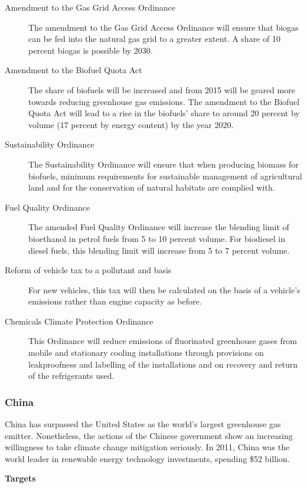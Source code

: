 \begin{description}
	\item[Amendment to the Gas Grid Access Ordinance] The amendment to the Gas Grid Access Ordinance will ensure that biogas can be fed into the natural gas grid to a greater extent. A share of 10 percent biogas is possible by 2030.
	\item[Amendment to the Biofuel Quota Act] The share of biofuels will be increased and from 2015 will be geared more towards reducing greenhouse gas emissions. The amendment to the Biofuel Quota Act will lead to a rise in the biofuels’ share to around 20 percent by volume (17 percent by energy content) by the year 2020.
	\item[Sustainability Ordinance] The Sustainability Ordinance will ensure that when producing biomass for biofuels, minimum requirements for sustainable management of agricultural land and for the conservation of natural habitats are complied with.
	\item[Fuel Quality Ordinance] The amended Fuel Quality Ordinance will increase the blending limit of bioethanol in petrol fuels from 5 to 10 percent volume. For biodiesel in diesel fuels, this blending limit will increase from 5 to 7 percent volume.
	\item[Reform of vehicle tax to a pollutant and  basis] For new vehicles, this tax will then be calculated on the basis of a vehicle's emissions rather than engine capacity as before.
	\item[Chemicals Climate Protection Ordinance] This Ordinance will reduce emissions of fluorinated greenhouse gases from mobile and stationary cooling installations through provisions on leakproofness and labelling of the installations and on recovery and return of the refrigerants used.
\end{description}



	\subsubsection{China}
	
	

China has surpassed the United States as the world’s largest greenhouse gas emitter.
Nonetheless, the actions of the Chinese government show an increasing willingness to take climate change mitigation seriously.
In 2011, China was the world leader in renewable energy technology investments, spending \$52 billion.



\textbf{Targets}



